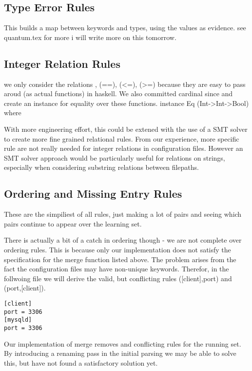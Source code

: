 \subsection{Type Error Rules}
This builds a map between keywords and types, using the values as evidence.
see quantum.tex for more
i will write more on this tomorrow.

\subsection{Integer Relation Rules}
we only consider the relations , (==), (<=), (>=) because they are easy to pass aroud (as actual functions) in haskell.
We also committed cardinal since and create an instance for equality over these functions.
instance Eq (Int->Int->Bool) where

With more engineering effort, this could be extened with the use of a SMT solver to create more fine grained relational rules.
From our experience, more specific rule are not really needed for integer relations in configuration files.
However an SMT solver approach would be particularly useful for relations on strings, especially when considering substring relations between filepaths.

\subsection{Ordering and Missing Entry Rules}
These are the simpiliest of all rules, just making a lot of pairs and seeing which pairs continue to appear over the learning set.

There is actually a bit of a catch in ordering though - we are not complete over ordering rules.
This is because only our implementation does not satisfy the specification for the merge function listed above.
The problem arises from the fact the configuration files may have non-unique keywords.
Therefor, in the follwoing file we will derive the valid, but conflicting rules ([client],port) and (port,[client]).
\begin{verbatim}
[client]
port = 3306
[mysqld]
port = 3306
\end{verbatim}
Our implementation of merge removes and conflicting rules for the running set.
By introducing a renaming pass in the initial parsing we may be able to solve this, but have not found a satisfactory solution yet.
